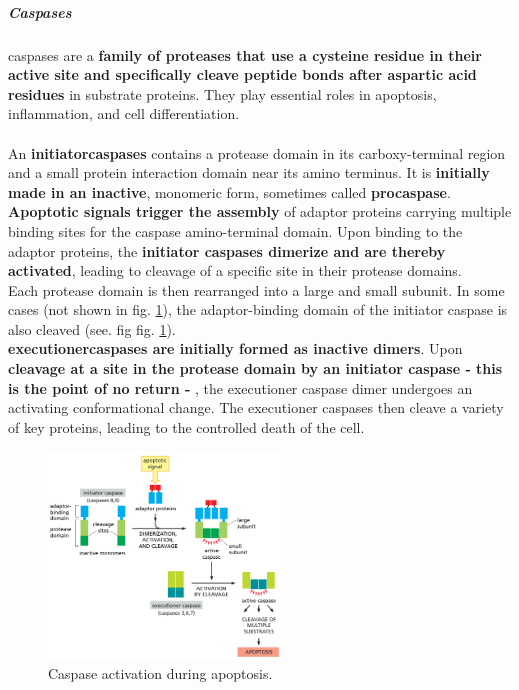 \documentclass[../main.tex]{subfiles}
\begin{document}
\subparagraph{Caspases}
\gls{caspases} are a\textbf{ family of proteases that use a cysteine residue in their active site and specifically cleave peptide bonds after aspartic acid residues} in substrate proteins. They play essential roles in apoptosis, inflammation, and cell differentiation.\\
\\
\indent An \textbf{\gls{initiatorcaspases}} contains a protease domain in its carboxy-terminal 
region and a small protein interaction domain near its amino terminus. It is \textbf{initially 
made in an inactive}, monomeric form, sometimes called \textbf{procaspase}. \textbf{Apoptotic signals trigger the assembly} of adaptor proteins carrying multiple binding sites for the caspase amino-terminal domain. Upon binding to the adaptor proteins, the \textbf{initiator caspases dimerize and are thereby activated}, leading to cleavage of a specific site in their protease domains. \\
\indent Each protease domain is then rearranged into a large and small subunit. In some cases 
(not shown in fig. \ref{caspase-activation}), the adaptor-binding domain of the initiator caspase is also cleaved (see. fig fig. \ref{caspase-activation}). \\
\indent \textbf{\gls{executionercaspases} are initially formed as inactive dimers}. Upon \textbf{cleavage at a site in the protease domain by an initiator caspase - this is the point of no return - }, the executioner caspase dimer undergoes an activating conformational change. The executioner caspases then cleave a variety of key proteins, leading to the controlled death of the cell. 

\begin{figure}[H]
	\centering
	\includegraphics[width = 0.55\textwidth]{2}
	\caption{Caspase activation during apoptosis.}
	\label{caspase-activation}
\end{figure}
\end{document}

